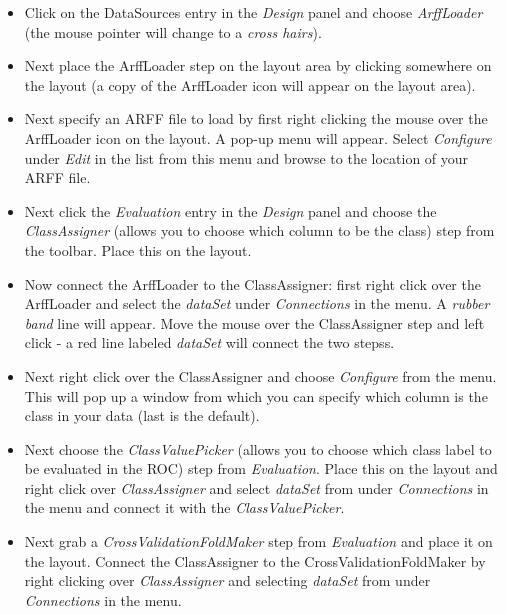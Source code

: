 \begin{itemize}
	\item Click on the DataSources entry in the \textit{Design}
          panel and choose \textit{ArffLoader} (the mouse pointer will
          change to a \textit{cross hairs}).

	\item Next place the ArffLoader step on the layout area by clicking
	somewhere on the layout (a copy of the ArffLoader icon will appear on
	the layout area).

	\item Next specify an ARFF file to load by first right clicking the mouse
	over the ArffLoader icon on the layout. A pop-up menu will
	appear. Select \textit{Configure} under \textit{Edit} in the list from this menu and
	browse to the location of your ARFF file.

	\item Next click the \textit{Evaluation} entry in the
          \textit{Design} panel and choose the \textit{ClassAssigner}
          (allows you to choose which column to be the class)
          step from the toolbar. Place this on the layout.

	\item Now connect the ArffLoader to the ClassAssigner: first right click
	over the ArffLoader and select the \textit{dataSet} under \textit{Connections} in
	the menu. A \textit{rubber band} line will appear. Move the mouse over the
	ClassAssigner step and left click - a red line labeled \textit{dataSet}
	will connect the two stepss.

	\item Next right click over the ClassAssigner and choose \textit{Configure} from
	the menu. This will pop up a window from which you can specify which
	column is the class in your data (last is the default).

	\item Next choose the \textit{ClassValuePicker} (allows you to
          choose which class label to be evaluated in the ROC)
          step from \textit{Evaluation}. Place this on
          the layout and right click over \textit{ClassAssigner} and
          select \textit{dataSet} from under \textit{Connections} in
          the menu and connect it with the \textit{ClassValuePicker}.

	\item Next grab a \textit{CrossValidationFoldMaker} step
          from \textit{Evaluation} and place it on the layout. Connect
          the ClassAssigner to the CrossValidationFoldMaker by right
          clicking over \textit{ClassAssigner} and selecting
          \textit{dataSet} from under \textit{Connections} in the
          menu.


\end{itemize}

